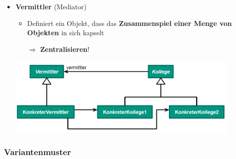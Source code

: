 \documentclass[parskip=full, 12pt]{scrartcl}
\begin{document}
\begin{itemize}
\begin{center}
					\end{center}
					\item \textbf{Vermittler} (Mediator)
					\begin{itemize}
						\item Definiert ein Objekt, dass das \textbf{Zusammenspiel einer Menge von Objekten} in sich kapselt
						
						$\Rightarrow$ \textbf{Zentralisieren}!
					\end{itemize}
					\begin{center}
						\includegraphics[width=0.9\textwidth]{../images/vermittler.png}
					\end{center}
				\end{itemize}
			
			\newpage
			\subsubsection{Variantenmuster}
			
\end{document}
